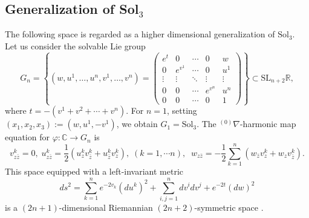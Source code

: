 \documentclass[12pt]{amsart}
\theoremstyle{definition}
\theoremstyle{remark}
\numberwithin{equation}{section}
\begin{document}
\subsection{Generalization of Sol$_3$}
 The following space is regarded as a higher dimensional 
 generalization of $\mathrm{Sol}_3$.
 Let us consider the solvable Lie group
\begin{equation*}
 G_n=\left\{(w, u^1, \dots, u^n, v^1, \dots, v^n)=
\left(
\begin{array}{ccccc}
e^{t} & 0 & \cdots &0 & w\\
0 & e^{v^1} & \cdots & 0 & u^1\\
\vdots & \vdots & \ddots & \vdots & \vdots\\
0 & 0 &\cdots &  e^{v^n} & u^n\\
0 & 0 &\cdots &  0 &1
\end{array}
\right)
\right\}
\subset 
\mathrm{SL}_{n+2}\mathbb{R}, 
\end{equation*}
 where $t=-(v^1+v^2+\cdots+v^n)$. 
 For $n=1$, setting $(x_1,x_2,x_3):=(w,u^1,-v^1)$,
 we obtain $G_1=\mathrm{Sol}_3$.
 The ${{}^{(0)}\nabla}$-harmonic map equation for $\varphi:\mathbb{C}\to G_n$ is 
\begin{equation*}
 v^{k}_{z\bar z}=0, \;
 u^{k}_{z\bar z}=\frac{1}{2}(u^k_zv^k_{\bar z}+u^k_{\bar z}v^k_{z}),
 \;(k =1, \cdots n),\;\;
 w_{z\bar z}=-\frac{1}{2}
\sum_{k=1}^{n}
 \left(
 w_{\bar z} v^k_{z}
 +w_{z} v^{k}_{\bar z}
 \right).
\end{equation*}
 This space equipped with a left-invariant metric
\begin{equation*}
 ds^2 = \sum_{k=1}^{n}e^{-2v_k}(du^k)^2+\sum _{i,j=1}^{n}dv^idv^j+e^{-2t}(dw)^2
\end{equation*}
 is a $(2n+1)$-dimensional Riemannian $(2n+2)$-symmetric 
 space \cite{Bozek, Kowalski}. 
\end{document}
